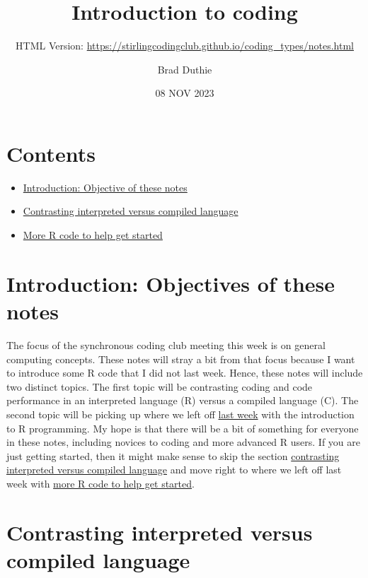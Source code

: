 \documentclass[
]{article}
\title{Introduction to coding}
\subtitle{HTML Version:
\url{https://stirlingcodingclub.github.io/coding_types/notes.html}}
\author{Brad Duthie}
\date{08 NOV 2023}
\providecommand{\tightlist}{%
  \setlength{\itemsep}{0pt}\setlength{\parskip}{0pt}}
\begin{document}
\maketitle

\hypertarget{contents}{%
\section{Contents}\label{contents}}

\begin{itemize}
\tightlist
\item
  \protect\hyperlink{intro}{Introduction: Objective of these notes}
\item
  \protect\hyperlink{contrast}{Contrasting interpreted versus compiled
  language}
\item
  \protect\hyperlink{Rcode}{More R code to help get started}
\end{itemize}

\hypertarget{introduction-objectives-of-these-notes}{%
\section{Introduction: Objectives of these
notes}\label{introduction-objectives-of-these-notes}}

The focus of the synchronous coding club meeting this week is on general
computing concepts. These notes will stray a bit from that focus because
I want to introduce some R code that I did not last week. Hence, these
notes will include two distinct topics. The first topic will be
contrasting coding and code performance in an interpreted language (R)
versus a compiled language (C). The second topic will be picking up
where we left off
\href{https://stirlingcodingclub.github.io/getting_started/notes.html}{last
week} with the introduction to R programming. My hope is that there will
be a bit of something for everyone in these notes, including novices to
coding and more advanced R users. If you are just getting started, then
it might make sense to skip the section
\protect\hyperlink{contrast}{contrasting interpreted versus compiled
language} and move right to where we left off last week with
\protect\hyperlink{Rcode}{more R code to help get started}.

\hypertarget{contrasting-interpreted-versus-compiled-language}{%
\section{Contrasting interpreted versus compiled
language}\label{contrasting-interpreted-versus-compiled-language}}
\end{document}
